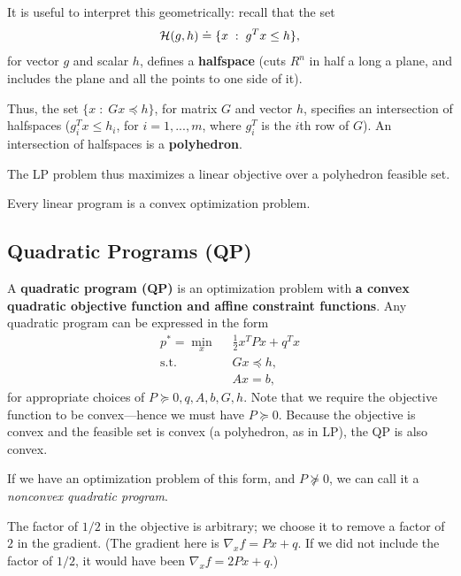 \documentclass[12pt]{article}
\begin{document}
It is useful to interpret this geometrically: recall that the set
%
\begin{equation*}
{\mathcal H}(g,h) \doteq \{x \; : \; g^T x \leq h\},
\end{equation*}
%
for vector $g$ and scalar $h$, defines a \textbf{halfspace} (cuts $R^{n}$ in half a long a plane, and includes the plane and all the points to one side of it).  

Thus, the set $\{x \; : \; Gx \preceq h\}$, for matrix $G$ and vector $h$, specifies an intersection of halfspaces ($g_i^T x \leq h_i$, for $i=1,...,m$, where $g_i^T$ is the $i$th row of $G$). An intersection of halfspaces is a \textbf{polyhedron}. 

The LP problem thus maximizes a linear objective over a polyhedron feasible set.

\begin{fact}
Every linear program is a convex optimization problem. 
\end{fact} 

\subsection{Quadratic Programs (QP)}

A \textbf{quadratic program (QP)} is an optimization problem with \textbf{a convex quadratic objective function and affine constraint functions}. Any quadratic program can be expressed in the form
%
\begin{equation}
\begin{aligned}
p^* = \min_{x} \;\; & \frac{1}{2} x^T P x + q^T x \\
\text{s.t. } & Gx \preceq h, \\
& Ax = b,
\end{aligned}\label{QP}
\end{equation}
%
for appropriate choices of $P \succeq 0, q, A, b, G, h$. Note that we require the objective function to be convex---hence we must have $P \succeq 0$. Because the objective is convex and the feasible set is convex (a polyhedron, as in LP), the QP is also convex.

If we have an optimization problem of this form, and $P \not \succeq 0$, we can call it a \textit{nonconvex quadratic program}.

\begin{remark}
The factor of $1/2$ in the objective is arbitrary; we choose it to remove a factor of $2$ in the gradient. (The gradient here is $\nabla_x f = P x + q$. If we did not include the factor of $1/2$, it would have been $\nabla_x f = 2 P x + q$.)
\end{remark}
\end{document}

